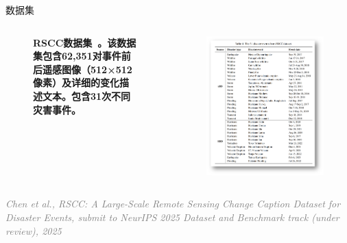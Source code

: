 \documentclass[11pt,aspectratio=169]{beamer}
\begin{document}
\begin{frame}{数据集}
\begin{columns}
\begin{column}{0.6\textwidth}
\begin{figure}
                {\tiny \textbf{RSCC数据集~\cite{chenRSCC2025}。该数据集包含62,351对事件前后遥感图像（512×512像素）及详细的变化描述文本。包含31次不同灾害事件。}}
            \end{figure}
        \end{column}
        \begin{column}{0.5\textwidth}
            \begin{figure}
                \centering
                \includegraphics[width=0.8\linewidth]{imagens/rscc2.png}
            \end{figure}
        \end{column}
    \end{columns}
    \begin{flushleft}
        {\tiny \textcolor{gray}{\textit{Chen et al., RSCC: A Large-Scale Remote Sensing Change Caption Dataset for Disaster Events, submit to NeurIPS 2025 Dataset and Benchmark track (under review), 2025
        }}}
    \end{flushleft}
\end{frame}
\end{document}
